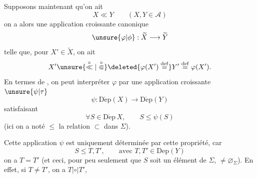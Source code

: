 
Supposons maintenant qu'on ait
\[
X\ll Y\qquad (X,Y\in\mathcal A)
\]
on a alors une application croissante canonique
\[
\unsure{\varphi|\phi}:\widetilde X\longrightarrow\widetilde Y
\]
telle que, pour  $X'\in\widetilde X$, on ait
\[
X'\unsure{\overset{\circ}{\ll}|\overset{\circ}{\Subset}}\deleted{\varphi(X')\overset{\mathrm{def}}{=}}Y'\overset{\mathrm{def}}{=}\varphi(X').
\]
En termes de , on peut interpréter $\varphi$ par une application croissante $\unsure{\psi|\tau}$
\[
\psi:\mathrm{D\acute{e}p}(X)\longrightarrow\mathrm{D\acute{e}p}(Y)
\]
satisfaisant
\[
\forall S\in\mathrm{D\acute{e}p}\,X,\qquad S\leq\psi(S)
\]
(ici on a noté $\leq$ la relation $\subset$ dans $\Sigma$).

Cette application $\psi$ est uniquement déterminée par cette propriété, car  
\[
S\leq T,T',\qquad\text{avec }T,T'\in\mathrm{Dep}(Y)
\]
on a $T=T'$ (et ceci, pour peu seulement que $S$ soit un élément de $\Sigma$, $\ne\varnothing_\Sigma$). En effet, si $T\ne T'$, on a $T\mathrel{|\circ|}T'$,
